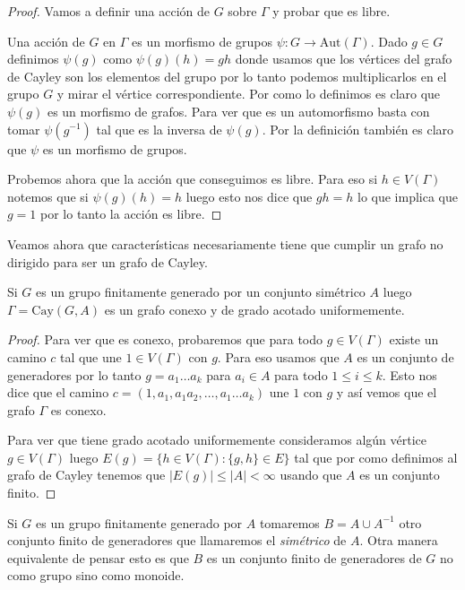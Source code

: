 \documentclass[tesis.tex]{subfiles}
\begin{document}
\begin{proof}
	Vamos a definir una acción de $G$ sobre $\Gamma$ y probar que es libre.
	
	Una acción de $G$ en $\Gamma$ es un morfismo de grupos $\psi: G \to \text{Aut}(\Gamma)$.
	Dado $g \in G$ definimos $\psi(g)$ como $\psi(g)(h) = gh$ donde usamos que los vértices del grafo de Cayley son los elementos del grupo por lo tanto podemos multiplicarlos en el grupo $G$ y mirar el vértice correspondiente.
	Por como lo definimos es claro que $\psi(g)$ es un morfismo de grafos. 
	Para ver que es un automorfismo basta con tomar $\psi(g^{-1})$ tal que es la inversa de $\psi(g)$.
	Por la definición también es claro que $\psi$ es un morfismo de grupos.
	
	Probemos ahora que la acción que conseguimos es libre.
	Para eso si $h \in V(\Gamma)$ notemos que si $\psi(g)(h) = h$ luego esto nos dice que $gh = h$ lo que implica que $g = 1$ por lo tanto la acción es libre.
	
\end{proof}

Veamos ahora que características necesariamente tiene que cumplir un grafo no dirigido para ser un grafo de Cayley.

\begin{lema}\label{lema_cayley_conexo_grado}
	Si $G$ es un grupo finitamente generado por un conjunto simétrico $A$ luego $\Gamma = \text{Cay}(G,A)$ es un grafo conexo y de grado acotado uniformemente.
\end{lema}
\begin{proof}
	Para ver que es conexo,	probaremos que para todo $g \in V(\Gamma)$ existe un camino $c$ tal que une $1 \in V(\Gamma)$ con $g$.
	Para eso usamos que $A$ es un conjunto de generadores por lo tanto $g = a_{1} \dots a_{k}$ para $a_{i} \in A$ para todo $1 \le i \le k$.
	Esto nos dice que el camino $c = (1, a_{1}, a_{1}a_{2}, \dots, a_{1} \dots a_{k})$ une $1$ con $g$ y así vemos que el grafo $\Gamma$ es conexo. 
	
	Para ver que tiene grado acotado uniformemente consideramos algún vértice $g \in V(\Gamma)$ luego $E(g) = \{  h \in V(\Gamma) : \{g,h\} \in E \}$ tal que por como definimos al grafo de Cayley tenemos que $|E(g)| \le |A| < \infty$ usando que $A$ es un conjunto finito.
\end{proof}

Si $G$ es un grupo finitamente generado por $A$ tomaremos $B = A \cup A^{-1}$ otro conjunto finito de generadores que llamaremos el \emph{simétrico} de $A$.
Otra manera equivalente de pensar esto es que $B$ es un conjunto finito de generadores de $G$ no como grupo sino como monoide.
\end{document}

